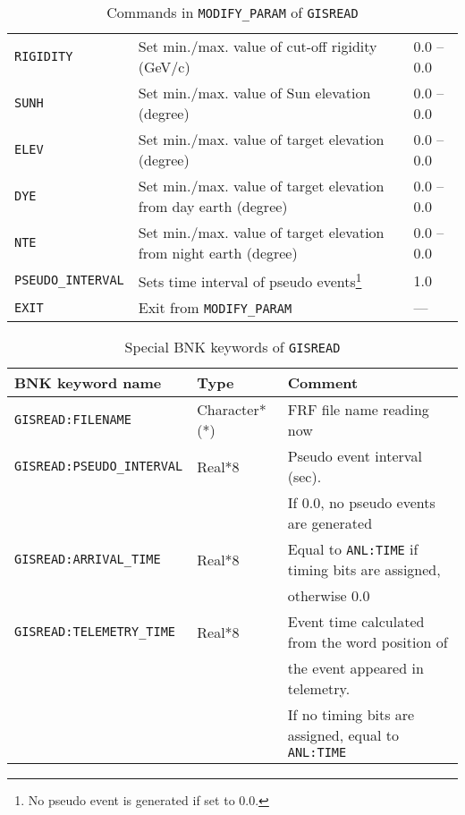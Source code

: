 \begin{table}[htb]
\begin{minipage}{\textwidth}
\begin{center}
\begin{tabular}{|l|l|l|}
{\tt RIGIDITY}
	& Set min./max. value of cut-off rigidity (GeV/c)
	& 0.0 -- 0.0 \\
{\tt SUNH}
	& Set min./max. value of Sun elevation (degree)
	& 0.0 -- 0.0 \\
{\tt ELEV}
	& Set min./max. value of target elevation (degree)
	& 0.0 -- 0.0 \\
{\tt DYE}
	& Set min./max. value of target elevation from day earth (degree)
	& 0.0 -- 0.0 \\
{\tt NTE}
	& Set min./max. value of target elevation from night earth (degree)
	& 0.0 -- 0.0 \\
{\tt PSEUDO\_INTERVAL}
	& Sets time interval of pseudo events\footnote{
		No pseudo event is generated if set to 0.0.}
	& 1.0 \\
{\tt EXIT}
	& Exit from {\tt MODIFY\_PARAM}
	& --- \\ \hline
\end{tabular}
\end{center}
\end{minipage}
\caption{Commands in {\tt MODIFY\_PARAM} of {\tt GISREAD}}
\label{tab:GISREAD:MODIFY_PARAM}
\end{table}

\begin{table}[htb]
\begin{minipage}{\textwidth}
\begin{center}
\begin{tabular}{|l|l|l|}
\hline
BNK keyword name & Type & Comment \\ \hline
{\tt GISREAD:FILENAME}
	& Character*(*)
	& FRF file name reading now \\
{\tt GISREAD:PSEUDO\_INTERVAL}
	& Real*8
	& Pseudo event interval (sec). \\
& 	& If 0.0, no pseudo events are generated \\
{\tt GISREAD:ARRIVAL\_TIME}
	& Real*8
	& Equal to {\tt ANL:TIME} if timing bits are assigned, \\
&	& otherwise 0.0 \\
{\tt GISREAD:TELEMETRY\_TIME}
	& Real*8
	& Event time calculated from the word position of \\
&	& the event appeared in telemetry. \\
&	& If no timing bits are assigned, equal to {\tt ANL:TIME} \\
\hline
\end{tabular}
\end{center}
\end{minipage}
\caption{Special BNK keywords of {\tt GISREAD}}
\label{tab:GISREAD:SpecialBNK}
\end{table}

